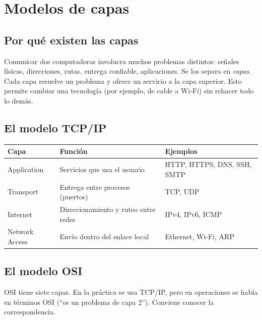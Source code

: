 \documentclass[11pt,a4paper]{article}
\theoremstyle{definition}
\theoremstyle{remark}
\begin{document}
\section{Modelos de capas}\label{sec:capas}

\subsection{Por qué existen las capas}

Comunicar dos computadoras involucra muchos problemas distintos: señales físicas, direcciones, rutas, entrega confiable, aplicaciones. Se los separa en \emph{capas}. Cada capa resuelve un problema y ofrece un servicio a la capa superior. Esto permite cambiar una tecnología (por ejemplo, de cable a Wi-Fi) sin rehacer todo lo demás.

\subsection{El modelo TCP/IP}

\begin{center}
\begin{tabular}{@{}llp{5.5cm}@{}}
\toprule
\textbf{Capa} & \textbf{Función} & \textbf{Ejemplos}\\
\midrule
Application & Servicios que usa el usuario & HTTP, HTTPS, DNS, SSH, SMTP\\
Transport & Entrega entre procesos (puertos) & TCP, UDP\\
Internet & Direccionamiento y ruteo entre redes & IPv4, IPv6, ICMP\\
Network Access & Envío dentro del enlace local & Ethernet, Wi-Fi, ARP\\
\bottomrule
\end{tabular}
\end{center}

\subsection{El modelo OSI}

OSI tiene siete capas. En la práctica se usa TCP/IP, pero en operaciones se habla en términos OSI (``es un problema de capa 2''). Conviene conocer la correspondencia.
\end{document}
